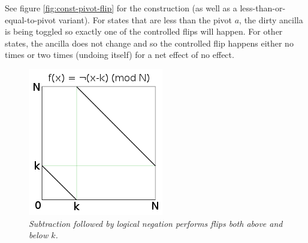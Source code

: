 \documentclass[twocolumn]{article}
\begin{document}
See figure \ref{fig:const-pivot-flip} for the construction (as well as a less-than-or-equal-to-pivot variant).
For states that are less than the pivot $a$, the dirty ancilla is being toggled so exactly one of the controlled flips will happen.
For other states, the ancilla does not change and so the controlled flip happens either no times or two times (undoing itself) for a net effect of no effect.

\begin{figure}
  \centering
  \includegraphics[width=\linewidth]{assets/double-flip.png}
  \caption{\em Subtraction followed by logical negation performs flips both above and below $k$.}
  \label{fig:double-flip}
\end{figure}
\end{document}
